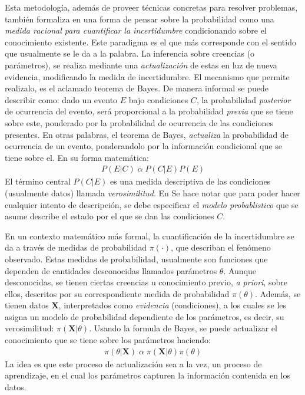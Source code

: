 \documentclass[../Main/Main.tex]{subfiles}
\begin{document}
Esta metodología, además de proveer técnicas concretas para resolver problemas, también formaliza en una forma de pensar sobre la probabilidad como una \textit{medida racional para cuantificar la incertidumbre} condicionando sobre el conocimiento existente. Este paradigma es el que más corresponde con el sentido que usualmente se le da a la palabra. La inferencia sobre creencias (o parámetros), se realiza mediante una \textit{actualización} de estas en luz de nueva evidencia, modificando la medida de incertidumbre. El mecanismo que permite realizalo, es el aclamado teorema de Bayes. De manera informal se puede describir como: dado un evento $E$ bajo condiciones $C$, la probabilidad \textit{posterior} de ocurrencia del evento, será proporcional a la probabilidad \textit{previa} que se tiene sobre este, ponderado por la probabilidad de ocurrencia de las condiciones presentes. En otras palabras, el teorema de Bayes, \textit{actualiza} la probabilidad de ocurrencia de un evento,  ponderandolo por la información condicional que se tiene sobre el. En su forma matemática: 
\begin{align}
P(E|C) \; \alpha \; P(C|E)P(E) \label{ec:BayesInformal}
\end{align}
El término central $P(C|E)$ es una medida descriptiva de las condiciones (usualmente datos) llamada \textit{verosimilitud}. En %
Se hace notar que para poder hacer cualquier intento de descripción, se debe especificar el \textit{modelo probablistico} que se asume describe el estado por el que se dan las condiciones $C$. 

En un contexto matemático más formal, la cuantificación de la incertidumbre se da a través de medidas de probabilidad $\pi(\cdot)$, que describan el fenómeno observado. Estas medidas de probabilidad, usualmente son funciones que dependen de cantidades desconocidas llamados parámetros $\theta$. Aunque desconocidas, se tienen ciertas creencias u conocimiento previo, \textit{a priori}, sobre ellos, descritos por su correspondiente medida de probabilidad $\pi(\theta)$. Además, se tienen datos $\mathbf{X}$, interpretados como \textit{evidencia} (condiciones), a los cuales se les asigna un modelo de probabilidad dependiente de los parámetros, es decir, su verosimilitud: $\pi(\mathbf{X}|\theta)$. Usando la formula de Bayes, se puede actualizar el conocimiento que se tiene sobre los parámetros haciendo:
\begin{align}
	\pi(\theta|\mathbf{X}) \; \alpha \; \pi(\mathbf{X}|\theta)\pi(\theta) \label{ec:BayesProporcional}
\end{align}
La idea es que este proceso de actualización sea a la vez, un proceso de aprendizaje, en el cual los parámetros capturen la información contenida en los datos.
\end{document}
